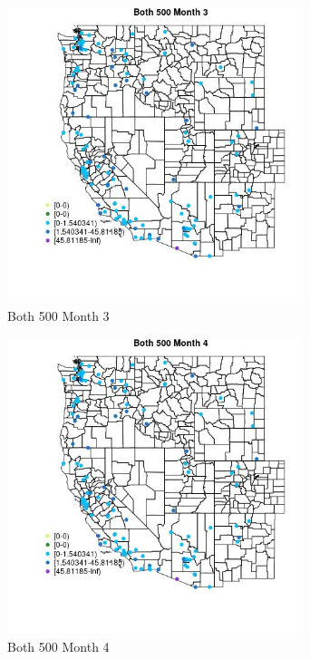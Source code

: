 \begin{figure} 
\centering  
\includegraphics[width=0.77\textwidth]{Code_Outputs/Report_ML_input_PM25_Step4_part_e_de_duplicated_aves_MapObsMo3Both_500.jpg} 
\caption{\label{fig:Report_ML_input_PM25_Step4_part_e_de_duplicated_avesMapObsMo3Both_500}Both 500 Month 3} 
\end{figure} 
 

\begin{figure} 
\centering  
\includegraphics[width=0.77\textwidth]{Code_Outputs/Report_ML_input_PM25_Step4_part_e_de_duplicated_aves_MapObsMo4Both_500.jpg} 
\caption{\label{fig:Report_ML_input_PM25_Step4_part_e_de_duplicated_avesMapObsMo4Both_500}Both 500 Month 4} 
\end{figure} 
 

